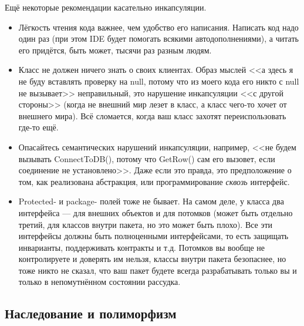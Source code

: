 \documentclass{../text-style}
\begin{document}
Ещё некоторые рекомендации касательно инкапсуляции.

\begin{itemize}
    \item Лёгкость чтения кода важнее, чем удобство его написания. Написать код надо один раз (при этом IDE будет помогать всякими автодополнениями), а читать его придётся, быть может, тысячи раз разным людям.
    \item Класс не должен ничего знать о своих клиентах. Образ мыслей <<а здесь я не буду вставлять проверку на null, потому что из моего кода его никто с null не вызывает>> неправильный, это нарушение инкапсуляции <<с другой стороны>> (когда не внешний мир лезет в класс, а класс чего-то хочет от внешнего мира). Всё сломается, когда ваш класс захотят переиспользовать где-то ещё.
    \item Опасайтесь семантических нарушений инкапсуляции, например, <<не будем вызывать ConnectToDB(), потому что GetRow() сам его вызовет, если соединение не установлено>>. Даже если это правда, это предположение о том, как реализована абстракция, или программирование \textit{сквозь} интерфейс.
    \item Protected- и package- полей тоже не бывает. На самом деле, у класса два интерфейса --- для внешних объектов и для потомков (может быть отдельно третий, для классов внутри пакета, но это может быть плохо). Все эти интерфейсы должны быть полноценными интерфейсами, то есть защищать инварианты, поддерживать контракты и т.д. Потомков вы вообще не контролируете и доверять им нельзя, классы внутри пакета безопаснее, но тоже никто не сказал, что ваш пакет будете всегда разрабатывать только вы и только в непомутнённом состоянии рассудка.
\end{itemize}

\subsection{Наследование и полиморфизм}
\end{document}
